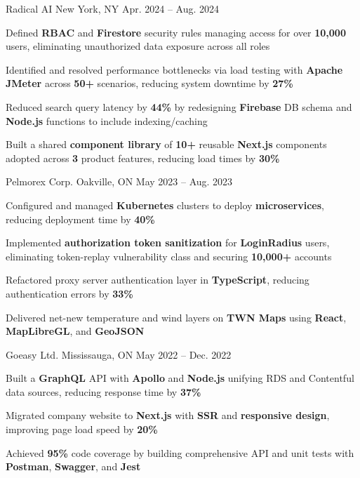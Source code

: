 \documentclass[11pt, a4paper]{awesome-cv}
\begin{document}
\begin{cventries}
  \cventry
    {\color{lightblue}{SOFTWARE ENGINEER INTERN}}
    {Radical AI}
    {New York, NY}
    {Apr. 2024 -- Aug. 2024}
    {
      \begin{cvitems}
        \item{Defined \textbf{RBAC} and \textbf{Firestore} security rules managing access for over \textbf{10,000} users, eliminating unauthorized data exposure across all roles}
        \item{Identified and resolved performance bottlenecks via load testing with \textbf{Apache JMeter} across \textbf{50+} scenarios, reducing system downtime by \textbf{27\%}}
        \item{Reduced search query latency by \textbf{44\%} by redesigning \textbf{Firebase} DB schema and \textbf{Node.js} functions to include indexing/caching}
        \item{Built a shared \textbf{component library} of \textbf{10+} reusable \textbf{Next.js} components adopted across \textbf{3} product features, reducing load times by \textbf{30\%}}
      \end{cvitems}
    }

  \vspace{3mm}

  \cventry
    {\color{lightblue}{SOFTWARE ENGINEER INTERN}}
    {Pelmorex Corp.}
    {Oakville, ON}
    {May 2023 -- Aug. 2023}
    {
      \begin{cvitems}
        \item{Configured and managed \textbf{Kubernetes} clusters to deploy \textbf{microservices}, reducing deployment time by \textbf{40\%}}
        \item{Implemented \textbf{authorization token sanitization} for \textbf{LoginRadius} users, eliminating token-replay vulnerability class and securing \textbf{10,000+} accounts}
        \item{Refactored proxy server authentication layer in \textbf{TypeScript}, reducing authentication errors by \textbf{33\%}}
        \item{Delivered net-new temperature and wind layers on \textbf{TWN Maps} using \textbf{React}, \textbf{MapLibreGL}, and \textbf{GeoJSON}}
      \end{cvitems}
    }

  \vspace{3mm}

  \cventry
    {\color{lightblue}{FRONT-END DEVELOPER INTERN}}
    {Goeasy Ltd.}
    {Mississauga, ON}
    {May 2022 -- Dec. 2022}
    {
      \begin{cvitems}
        \item{Built a \textbf{GraphQL} API with \textbf{Apollo} and \textbf{Node.js} unifying RDS and Contentful data sources, reducing response time by \textbf{37\%}}
        \item{Migrated company website to \textbf{Next.js} with \textbf{SSR} and \textbf{responsive design}, improving page load speed by \textbf{20\%}}
        \item{Achieved \textbf{95\%} code coverage by building comprehensive API and unit tests with \textbf{Postman}, \textbf{Swagger}, and \textbf{Jest}}
      \end{cvitems}
    }


\end{cventries}
\end{document}
